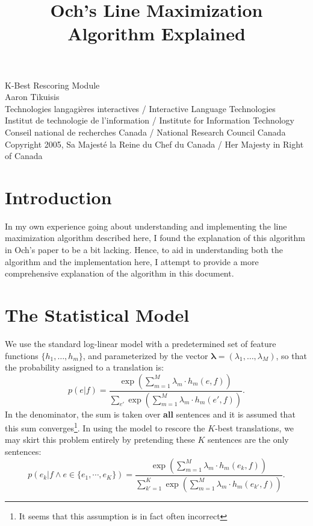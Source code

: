 \documentclass[12pt]{amsart}
\begin{document}
\title{Och's Line Maximization Algorithm Explained}
\maketitle

{\tiny
\noindent
K-Best Rescoring Module\\
Aaron Tikuisis\\
Technologies langagi{\`e}res interactives / Interactive Language Technologies\\
Institut de technologie de l'information / Institute for Information Technology\\
Conseil national de recherches Canada / National Research Council Canada\\
Copyright 2005, Sa Majest{\'e} la Reine du Chef du Canada / Her Majesty in Right of Canada
}


\section{Introduction\label{sec:intro}}
In my own experience going about understanding and implementing the line maximization algorithm described here, I found the explanation of this algorithm in Och's paper to be a bit lacking.
Hence, to aid in understanding both the algorithm and the implementation here, I attempt to provide a more comprehensive explanation of the algorithm in this document.

\section{The Statistical Model\label{sec:model}}
We use the standard log-linear model with a predetermined set of feature functions $\{h_1, \dots , h_m\}$, and parameterized by the vector $\boldsymbol{\lambda} = (\lambda_1, \dots , \lambda_M)$, so that the probability assigned to a translation is:
\[ p(e|f) = \frac
{\exp \left( \sum_{m=1}^M \lambda_m \cdot h_m(e,f) \right)}
{\sum_{e'} \exp \left( \sum_{m=1}^M \lambda_m \cdot h_m(e',f) \right)}. \]
In the denominator, the sum is taken over \textbf{all} sentences and it is assumed that this sum converges\footnote{It seems that this assumption is in fact often incorrect}.
In using the model to rescore the $K$-best translations, we may skirt this problem entirely by pretending these $K$ sentences are the only sentences:
\[ p(e_k|f \land e \in \{e_1, \cdots , e_K\}) = \frac
{\exp \left( \sum_{m=1}^M \lambda_m \cdot h_m(e_k,f) \right)}
{\sum_{k'=1}^K \exp \left( \sum_{m=1}^M \lambda_m \cdot h_m(e_{k'},f) \right)}. \]
\end{document}
